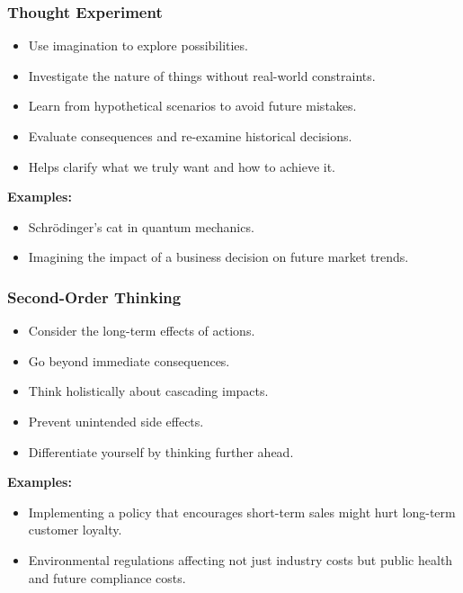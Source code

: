 \begin{frame}[fragile]\frametitle{Thought Experiment}
\begin{itemize}
    \item Use imagination to explore possibilities.
    \item Investigate the nature of things without real-world constraints.
    \item Learn from hypothetical scenarios to avoid future mistakes.
    \item Evaluate consequences and re-examine historical decisions.
    \item Helps clarify what we truly want and how to achieve it.
\end{itemize}
\textbf{Examples:}
\begin{itemize}
    \item Schrödinger's cat in quantum mechanics.
    \item Imagining the impact of a business decision on future market trends.
\end{itemize}
\end{frame}

\begin{frame}[fragile]\frametitle{Second-Order Thinking}
\begin{itemize}
    \item Consider the long-term effects of actions.
    \item Go beyond immediate consequences.
    \item Think holistically about cascading impacts.
    \item Prevent unintended side effects.
    \item Differentiate yourself by thinking further ahead.
\end{itemize}
\textbf{Examples:}
\begin{itemize}
    \item Implementing a policy that encourages short-term sales might hurt long-term customer loyalty.
    \item Environmental regulations affecting not just industry costs but public health and future compliance costs.
\end{itemize}
\end{frame}


